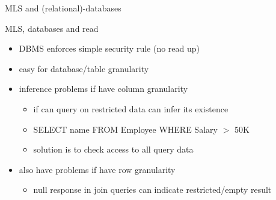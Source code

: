\documentclass{beamer}
\begin{document}
\begin{frame}{MLS and (relational)-databases}
\end{frame}

\begin{frame}{MLS, databases and read}
  \begin{itemize}
  \item DBMS enforces simple security rule (no read up) 
  \item easy for database/table granularity
  \item inference problems if have column granularity
    \begin{itemize}
    \item if can query on restricted data can infer its existence 
    \item SELECT name FROM Employee WHERE Salary $>$ 50K 
    \item solution is to check access to all query data 
    \end{itemize}
  \item also have problems if have row granularity 
    \begin{itemize}
    \item null response in join queries can indicate restricted/empty result 
    \end{itemize}
  \end{itemize}
\end{frame}
\end{document}
